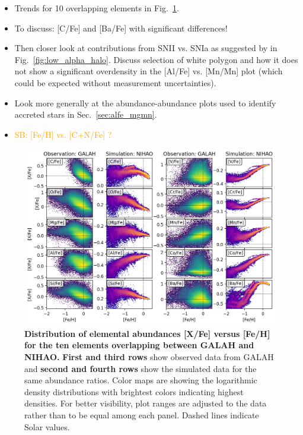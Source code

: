 \documentclass[fleqn,usenatbib]{mnras}
\newcommand{\SB}[1]{{\textcolor{orange}{SB: #1}}}
\begin{document}
\begin{itemize}
    \item Trends for 10 overlapping elements in Fig.~\ref{fig:FeH_XFe}.
    \item To discuss: [C/Fe] and [Ba/Fe] with significant differences!
    \item Then closer look at contributions from SNII vs. SNIa as suggested by \citet{Nissen2010} in Fig.~\ref{fig:low_alpha_halo}. Discuss selection of white polygon and how it does not show a significant overdensity in the [Al/Fe] vs. [Mn/Mn] plot (which could be expected without measurement uncertainties).
    \item Look more generally at the abundance-abundance plots used to identify accreted stars in Sec.~\ref{sec:alfe_mgmn}.
    \item \SB{[Fe/H] vs. [C+N/Fe] \citep{Hawkins2015}?}
\end{itemize}

\begin{figure}
	\includegraphics[width=\textwidth]{figures/Overview_FeH_XFe_Obs_Sim.png}
    \caption{
    \textbf{Distribution of elemental abundances [X/Fe] versus [Fe/H] for the ten elements overlapping between GALAH and NIHAO.} 
    \textbf{First and third rows} show observed data from GALAH and \textbf{second and fourth rows} show the simulated data for the same abundance ratios. Color maps are showing the logarithmic density distributions with brightest colors indicating highest densities. For better visibility, plot ranges are adjusted to the data rather than to be equal among each panel. Dashed lines indicate Solar values.}
    \label{fig:FeH_XFe}
\end{figure}
\end{document}
